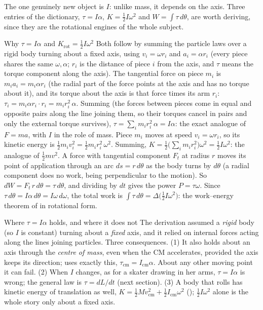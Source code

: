 The one genuinely new object is $I$: unlike mass, it depends on the axis. Three entries of
the dictionary, $\tau=I\alpha$, $K=\tfrac12I\omega^2$ and $W=\int\tau\,d\theta$, are worth deriving, since
they are the rotational engines of the whole subject.

\begin{derivbox}{Why $\tau=I\alpha$ and $K_{\text{rot}}=\tfrac{1}{2} I\omega^2$}
\small
Both follow by summing the particle laws over a rigid body turning about a fixed axis, using $v_i=\omega r_i$ and $a_i=\alpha r_i$
(every piece shares the same $\omega,\alpha$; $r_i$ is the distance of piece $i$ from the axis, and $\tau$ means the torque component along the axis).
 The tangential force on piece $m_i$ is $m_i a_i=m_i\alpha r_i$ (the radial part of
the force points at the axis and has no torque about it), and its torque
about the axis is that force times its arm $r_i$: $\tau_i=m_i\alpha r_i\cdot r_i=m_i r_i^2\,\alpha$.
Summing (the forces between pieces come in equal and opposite pairs along the line joining them, so
their torques cancel in pairs and only the external torque survives), $\tau=\sum_i m_i r_i^2\,\alpha=I\alpha$: the exact analogue of $F=ma$, with $I$ in the role of
mass.
 Piece $m_i$ moves at speed $v_i=\omega r_i$, so its kinetic energy is
$\tfrac{1}{2} m_i v_i^2=\tfrac{1}{2} m_i r_i^2\,\omega^2$. Summing,
$K=\tfrac{1}{2}\big(\sum_i m_i r_i^2\big)\omega^2=\tfrac{1}{2} I\omega^2$: the analogue of $\tfrac{1}{2} mv^2$.
 A force with tangential component $F_t$ at radius $r$ moves its point of
application through an arc $ds=r\,d\theta$ as the body turns by $d\theta$ (a radial component does no
work, being perpendicular to the motion). So $dW=F_t\,r\,d\theta=\tau\,d\theta$, and dividing by $dt$
gives the power $P=\tau\omega$. Since $\tau\,d\theta=I\alpha\,d\theta=I\omega\,d\omega$, the total work is
$\int\tau\,d\theta=\Delta\big(\tfrac{1}{2} I\omega^2\big)$: the work--energy theorem of 
in rotational form.
\end{derivbox}

\begin{remarkbox}{Where $\tau=I\alpha$ holds, and where it does not}
The derivation assumed a \emph{rigid} body (so $I$ is constant) turning about a \emph{fixed} axis, and it
relied on internal forces acting along the lines joining particles. Three consequences.
(1) It also holds about an axis through the \emph{centre of mass}, even when the CM accelerates, provided
the axis keeps its direction;  uses exactly this, $\tau_{\text{cm}}=I_{\text{cm}}\alpha$. About
any other moving point it can fail.
(2) When $I$ changes, as for a skater drawing in her arms, $\tau=I\alpha$ is wrong; the general law is
$\tau=dL/dt$ (next section).
(3) A body that rolls has kinetic energy of translation as well, $K=\tfrac12Mv_{\text{cm}}^2+\tfrac12I_{\text{cm}}\omega^2$
(); $\tfrac12I\omega^2$ alone is the whole story only about a fixed axis.
\end{remarkbox}

